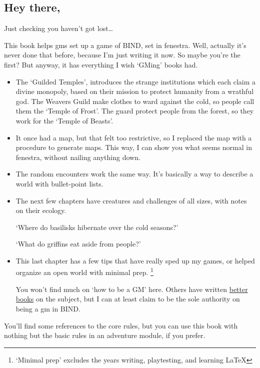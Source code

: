 \begin{multicols}{2}

\subsection{Hey there,}

Just checking you haven't got lost\ldots

This book helps \glspl{gm} set up a game of BIND, set in \gls{fenestra}.
Well, actually it's never done that before, because I'm just writing it now.
So maybe you're the first?
But anyway, it has everything I wish `GMing' books had.

\begin{itemize}
  \item
  The `Guilded Temples', introduces the strange institutions which each claim a divine monopoly, based on their mission to protect humanity from a wrathful god.
  The Weavers Guild make clothes to ward against the cold, so people call them the `Temple of Frost'.
  The \gls{guard} protect people from the forest, so they work for the `Temple of Beasts'.
  \item
  It once had a map, but that felt too restrictive, so I replaced the map with a procedure to generate maps.
  This way, I can show you what seems normal in \gls{fenestra}, without nailing anything down.
  \item
  The random encounters work the same way.
  It's basically a way to describe a world with bullet-point lists.
  \item
  The next few chapters have creatures and challenges of all sizes, with notes on their ecology.

  `Where do basilisks hibernate over the cold seasons?'

  `What do griffins eat aside from people?'
  \item
  This last chapter has a few tips that have really sped up my games, or helped organize an open world with minimal prep.%
  \footnote{`Minimal prep' excludes the years writing, playtesting, and learning \LaTeX}

  You won't find much on `how to be a GM' here.
  Others have written \href{https://thealexandrian.net/so-you-want-to-be-a-game-master}{better books} on the subject, but I can at least claim to be the sole authority on being a \gls{gm} in BIND.

\end{itemize}

You'll find some references to the core rules, but you can use this book with nothing but the basic rules in an adventure module, if you prefer.


\end{multicols}
